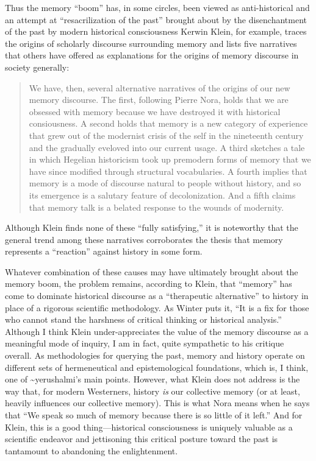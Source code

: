 Thus the memory ``boom'' has, in some circles, been viewed as
anti-historical and an attempt at ``resacrilization of the past''
brought about by the disenchantment of the past by modern historical
consciousness\autocite[282]{winter2006} Kerwin Klein, for example,
traces the origins of scholarly discourse surrounding memory and lists
five narratives that others have offered as explanations for the origins
of memory discourse in society generally:

\begin{quote}
We have, then, several alternative narratives of the origins of our new
memory discourse. The first, following Pierre Nora, holds that we are
obsessed with memory because we have destroyed it with historical
consiousness. A second holds that memory is a new category of experience
that grew out of the modernist crisis of the self in the nineteenth
century and the gradually eveloved into our current usage. A third
sketches a tale in which Hegelian historicism took up premodern forms of
memory that we have since modified through structural vocabularies. A
fourth implies that memory is a mode of discourse natural to people
without history, and so its emergence is a salutary feature of
decolonization. And a fifth claims that memory talk is a belated
response to the wounds of modernity.\autocite[134]{klein_klein2011}
\end{quote}

Although Klein finds none of these ``fully satisfying,'' it is
noteworthy that the general trend among these narratives corroborates
the thesis that memory represents a ``reaction'' against history in some
form.

Whatever combination of these causes may have ultimately brought about
the memory boom, the problem remains, according to Klein, that
``memory'' has come to dominate historical discourse as a ``therapeutic
alternative'' to history in place of a rigorous scientific
methodology.\autocite[137]{klein2011} As Winter puts it, ``It is a fix
for those who cannot stand the harshness of critical thinking or
historical analysis.''\autocite[283]{winter2006} Although I think Klein
under-appreciates the value of the memory discourse as a meaningful mode
of inquiry, I am in fact, quite sympathetic to his critique overall. As
methodologies for querying the past, memory and history operate on
different sets of hermeneutical and epistemological foundations, which
is, I think, one of \textasciitilde{}yerushalmi's main points. However,
what Klein does not address is the way that, for modern Westerners,
history \emph{is} our collective memory (or at least, heavily influences
our collective memory). This is what Nora means when he says that ``We
speak so much of memory because there is so little of it
left.''\autocite[7]{nora_representations1989} And for Klein, this is a
good thing---historical consciousness is uniquely valuable as a
scientific endeavor and jettisoning this critical posture toward the
past is tantamount to abandoning the enlightenment.

